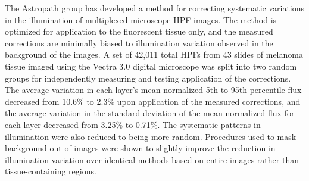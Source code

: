 \documentclass[letterpaper,11pt]{article}
\begin{document}
The Astropath group has developed a method for correcting systematic variations in the illumination of multiplexed microscope HPF images. The method is optimized for application to the fluorescent tissue only, and the measured corrections are minimally biased to illumination variation observed in the background of the images. A set of 42,011 total HPFs from 43 slides of melanoma tissue imaged using the Vectra 3.0 digital microscope was split into two random groups for independently measuring and testing application of the corrections. The average variation in each layer's mean-normalized 5th to 95th percentile flux decreased from 10.6\% to 2.3\% upon application of the measured corrections, and the average variation in the standard deviation of the mean-normalized flux for each layer decreased from 3.25\% to 0.71\%. The systematic patterns in illumination were also reduced to being more random. Procedures used to mask background out of images were shown to slightly improve the reduction in illumination variation over identical methods based on entire images rather than tissue-containing regions.

\clearpage

\end{document}
